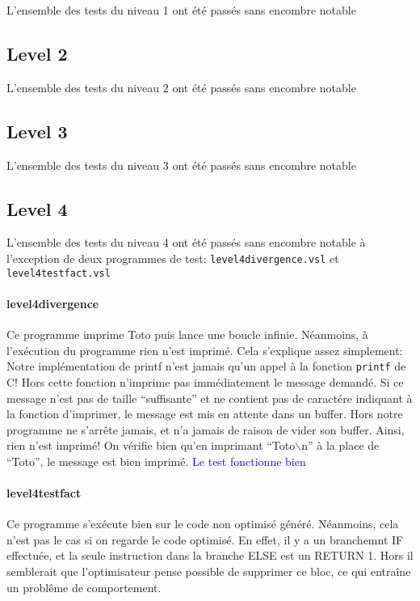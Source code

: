 \documentclass{article}
\begin{document}
L'ensemble des tests du niveau 1 ont été passés sans encombre notable

\subsection{Level 2}

L'ensemble des tests du niveau 2 ont été passés sans encombre notable

\subsection{Level 3}

L'ensemble des tests du niveau 3 ont été passés sans encombre notable

\subsection{Level 4}

L'ensemble des tests du niveau 4 ont été passés sans encombre notable à
l'exception de deux programmes de test: \texttt{level4divergence.vsl} et
\texttt{level4testfact.vsl}

\paragraph{level4divergence}

Ce programme imprime Toto puis lance une boucle infinie. Néanmoins, à
l'exécution du programme rien n'est imprimé. Cela s'explique assez simplement:
Notre implémentation de printf n'est jamais qu'un appel à la fonction
\texttt{printf} de C! Hors cette fonction n'imprime pas immédiatement le message
demandé. Si ce message n'est pas de taille ``suffisante'' et ne contient pas de
caractére indiquant à la fonction d'imprimer, le message est mis en attente dans
un buffer. Hors notre programme ne s'arrête jamais, et n'a jamais de raison de
vider son buffer. Ainsi, rien n'est imprimé! On vérifie bien qu'en imprimant
``Toto$\backslash$n'' à la place de ``Toto'', le message est bien imprimé. \textcolor{blue}{Le
  test fonctionne bien}

\paragraph{level4testfact}

Ce programme s'exécute bien sur le code non optimisé généré. Néanmoins, cela
n'est pas le cas si on regarde le code optimisé. En effet, il y a un branchemnt
IF effectuée, et la seule instruction dans la branche ELSE est un RETURN 1. Hors
il semblerait que l'optimisateur pense possible de supprimer ce bloc, ce qui
entraîne un problême de comportement.
\end{document}
